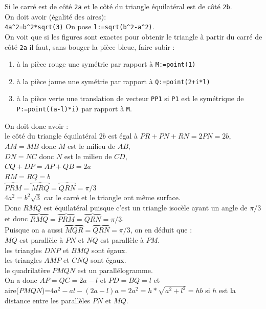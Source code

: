 \documentclass[a4paper,11pt]{book}
\begin{document}
Si le carr\'e est de c\^ot\'e {\tt 2a} et le c\^ot\'e du triangle 
\'equilat\'eral est de c\^ot\'e {\tt 2b}.\\ 
On doit avoir (\'egalit\'e des aires):\\
{\tt 4a\verb|^|2=b\verb|^|2*sqrt(3)}
On pose {\tt l:=sqrt(b\verb|^|2-a\verb|^|2)}.\\
On voit que si les figures sont exactes pour obtenir le triangle \`a partir du 
carr\'e de c\^ot\'e {\tt 2a} il faut, sans bouger la pi\`ece bleue, 
faire subir :
\begin{enumerate}
\item \`a la pi\`ece rouge une sym\'etrie par rapport \`a {\tt M:=point(1)} 
\item \`a la pi\`ece jaune une sym\'etrie par rapport \`a {\tt Q:=point(2+i*l)}
\item \`a la pi\`ece verte une translation de vecteur {\tt PP1} si {\tt P1} 
est le sym\'etrique de {\tt P:=point((a-l)*i)}  par rapport \`a {\tt M}.
\end{enumerate}
On doit donc avoir :\\
le c\^ot\'e du triangle \'equilat\'eral $2b$ est \'egal \`a $PR+PN+RN=2PN=2b$,\\
$AM=MB$ donc $M$ est le milieu de $AB$,\\
$DN=NC$ donc $N$ est le milieu de $CD$,\\
$CQ+DP=AP+QB=2a$\\
$RM=RQ=b$\\
$\overbrace{PRM}=\overbrace{MRQ}=\overbrace{QRN}=\pi/3$\\
$4a^2=b^2\sqrt 3$ car le carr\'e et le triangle ont m\^eme surface.\\
Donc $RMQ$ est \'equilat\'eral puisque c'est un triangle isoc\`ele ayant un 
angle de $\pi/3$ et donc 
$\overbrace{RMQ}=\overbrace{PRM}=\overbrace{QRN}=\pi/3$.\\
Puisque on a aussi $\overbrace{MQR}=\overbrace{QRN}=\pi/3$, on en d\'eduit 
que :\\ 
$MQ$ est parall\`ele \`a $PN$ et  $NQ$ est parall\`ele \`a $PM$.\\
les triangles $DNP$ et $BMQ$ sont \'egaux.\\
les triangles $AMP$ et $CNQ$ sont \'egaux.\\ 
le quadrilat\`ere $PMQN$ est un parall\'elogramme.\\
On a donc $AP=QC=2a-l$ et $PD=BQ=l$ et\\ 
aire($PMQN$)=$4a^2-al-(2a-l)a=2a^2=h*\sqrt{a^2+l^2}=hb$ si $h$ est la 
distance entre les parall\`eles  $PN$ et $MQ$.\\
\end{document}
